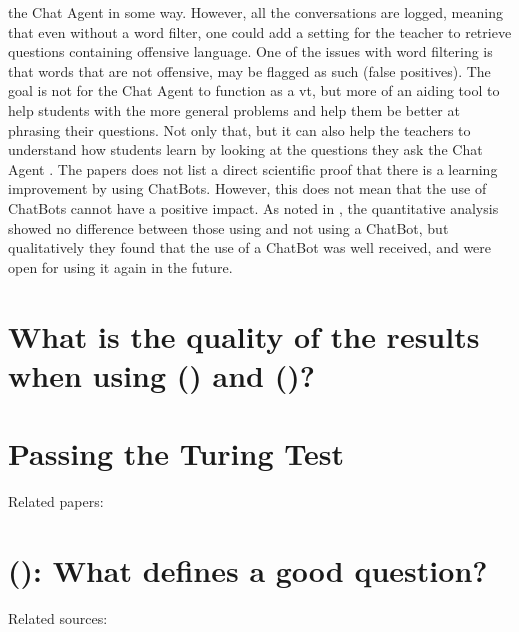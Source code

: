 the Chat Agent in some way. However, all the conversations are logged, meaning that even without a word filter, one could add a setting for the teacher to retrieve questions 
containing offensive language. One of the issues with word filtering is that words that are not offensive, may be flagged as such (false positives). 
\vspace{0.5em}\newline
The goal is not for the Chat Agent to function as a \gls{vt}, but more of an aiding tool to help students with the more general problems and help them be better at phrasing 
their questions. Not only that, but it can also help the teachers to understand how students learn by looking at the questions they ask the Chat Agent \cite{Knill2004,Rossi2011}. 
The papers does not list a direct scientific proof that there is a learning improvement by using ChatBots. However, this does not mean that the use of ChatBots cannot have a 
positive impact. As noted in \cite{Kowalski2013}, the quantitative analysis showed no difference between those using and not using a ChatBot, but qualitatively they found that 
the use of a ChatBot was well received, and were open for using it again in the future.


\section{What is the quality of the results when using  () and  ()?}
\label{chapter3:quality_results_hmm_bn}


\section{Passing the Turing Test}
\label{chapter3:turing_test}

Related papers: \cite{Harnad2000,Livingstone2006,Turing1998}

\section{ (): What defines a good question?}
\label{chapter3:define_good_question}

Related sources: \cite{Stackoverflow.com2015,CommunityWiki2015,Lezina2013,Stackoverflow.com2015a,Stackoverflow.com2015b,Stackoverflow.com2015c,Treude2011}






